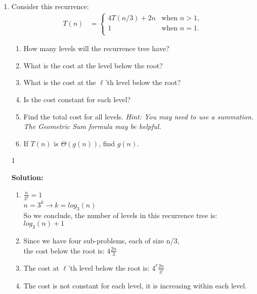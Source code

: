 \documentclass[9pt]{article}
\def\solutions{1}
\begin{document}
\begin{enumerate}
\item Consider this recurrence:
  \begin{align*}
    T(n) & = \begin{cases}
      4T(n/3)+2n & \text{when } n > 1, \\
      1 & \text{when } n = 1. \\
    \end{cases}
  \end{align*}
  \begin{enumerate}
  \item How many levels will the recurrence tree have?
  \item What is the cost at the level below the root?
  \item What is the cost at the $\ell$'th level below the root?
  \item Is the cost constant for each level?
  \item Find the total cost for all levels.  \emph{Hint: You may need to use a summation.  The Geometric Sum formula may be helpful.}
  \item If $T(n)$ is $\Theta(g(n))$, find $g(n)$.
  \end{enumerate}

\if\solutions1
\vspace{2mm}

\textbf{Solution:} \\
\begin{enumerate}
  \item $\frac{n}{3^k}=1$\\
  $n=3^k \rightarrow k=log_3(n)$\\
  So we conclude, the number of levels in this recurrence tree is: $log_3(n)+1$\\
  
  \item Since we have four sub-problems, each of size n/3, \\
  the cost below the root is: $4\frac{2n}{3}$\\
  
  \item The cost at $\ell$'th level below the root is: $4^\ell\frac{2n}{3^l}$\\
  
  \item The cost is not constant for each level, it is increasing within each level. 
  

\end{enumerate}
\end{enumerate}
\end{document}
